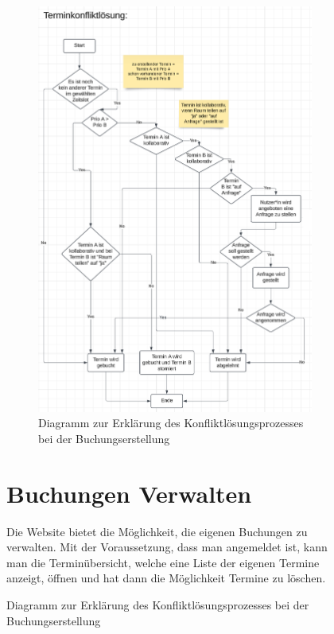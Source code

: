 \begin{figure}[ht]
\begin{figure}[ht]
    \centering
    \includegraphics[width=\textwidth]{figures/activity/terminkonfliktloesung}
    \caption{Diagramm zur Erklärung des Konfliktlösungsprozesses bei der Buchungserstellung}
    \label{fig:resolve-conflict-diagram}
\end{figure}
\clearpage

\section{Buchungen Verwalten}

Die Website bietet die Möglichkeit, die eigenen Buchungen zu verwalten. Mit der Voraussetzung,
dass man angemeldet ist, kann man die Terminübersicht, welche eine Liste der eigenen Termine anzeigt,
öffnen und hat dann die Möglichkeit Termine zu löschen.


\end{figure}
